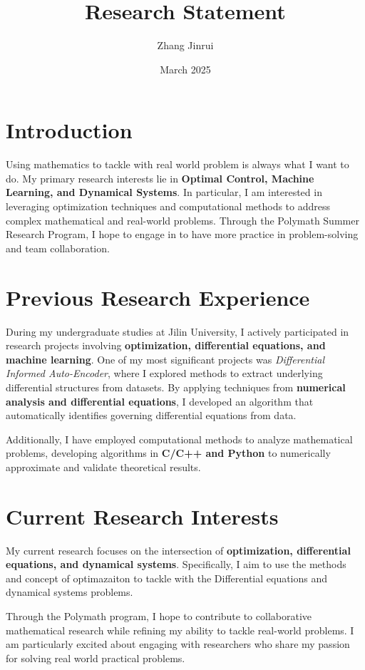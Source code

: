 \documentclass[a4paper,11pt]{article}
\title{\textbf{Research Statement}}
\author{Zhang Jinrui}
\date{March 2025}
\begin{document}
\maketitle
\onehalfspacing

\section*{Introduction}
Using mathematics to tackle with real world
problem is always what I want to do.
My primary research interests lie
in \textbf{Optimal
    Control, Machine Learning,
    and Dynamical Systems}.
In particular,
I am interested in
leveraging optimization
techniques and
computational methods to
address complex
mathematical and real-world problems.
Through the Polymath Summer Research
Program, I hope to engage in
to have more practice in problem-solving
and team collaboration.

\section*{Previous Research Experience}
During my undergraduate studies at Jilin University, I actively participated in research projects involving \textbf{optimization, differential equations, and machine learning}. One of my most significant projects was \textit{Differential Informed Auto-Encoder}\cite{zhang2024differentialinformedautoencoder}, where I explored methods to extract underlying differential structures from datasets. By applying techniques from \textbf{numerical analysis and differential equations}, I developed an algorithm that automatically identifies governing differential equations from data.

Additionally, I have employed computational methods to analyze mathematical problems, developing algorithms in \textbf{C/C++ and Python} to numerically approximate and validate theoretical results.

\section*{Current Research Interests}
My current research focuses on the intersection of \textbf{optimization, differential equations, and dynamical systems}. Specifically, I aim to use the
methods and concept of optimazaiton to
tackle with the Differential equations and dynamical systems problems.

Through the Polymath program, I hope to contribute to collaborative mathematical research while refining my ability to tackle real-world problems. I am particularly excited about engaging with researchers who share my passion for solving real world practical problems.
\end{document}
